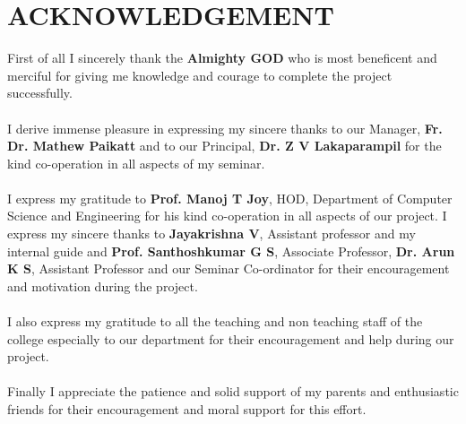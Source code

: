 \chapter*{ACKNOWLEDGEMENT}
\begin{spacing}{1.5}
First of all I sincerely thank the \textbf{Almighty GOD} who is most beneficent and merciful for giving me knowledge and courage to complete the project successfully.\\\\
I derive immense pleasure in expressing my sincere thanks to our Manager,\textbf{ Fr. Dr. Mathew Paikatt} and to our Principal, \textbf{Dr. Z V Lakaparampil} for the kind co-operation in all aspects of my seminar.\\\\
I express my gratitude to \textbf{Prof. Manoj T Joy}, HOD, Department of Computer Science and Engineering for his kind co-operation in all aspects of our project. I express my sincere thanks to\textbf{ Jayakrishna V}, Assistant professor and my internal guide and \textbf{Prof. Santhoshkumar G S}, Associate Professor, \textbf{Dr. Arun K S}, Assistant Professor and our Seminar Co-ordinator for their encouragement and motivation during the project.\\\\
I also express my gratitude to all the teaching and non teaching staff of the college especially to our department for their encouragement and help during our project.\\\\
Finally I appreciate the patience and solid support of my parents and enthusiastic friends for their encouragement and moral support for this effort.

\end{spacing}


